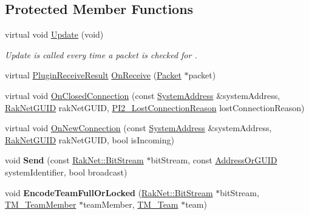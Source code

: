 \subsection*{Protected Member Functions}
\begin{DoxyCompactItemize}
\item 
\hypertarget{class_rak_net_1_1_team_manager_aa347824c887a1032b383143a96855218}{virtual void \hyperlink{class_rak_net_1_1_team_manager_aa347824c887a1032b383143a96855218}{Update} (void)}\label{class_rak_net_1_1_team_manager_aa347824c887a1032b383143a96855218}

\begin{DoxyCompactList}\small\item\em Update is called every time a packet is checked for . \end{DoxyCompactList}\item 
virtual \hyperlink{group___p_l_u_g_i_n___i_n_t_e_r_f_a_c_e___g_r_o_u_p_ga89998adaafb29e5d879113b992161085}{Plugin\-Receive\-Result} \hyperlink{class_rak_net_1_1_team_manager_a6e2cc8a3ca194ab60c74e11f1e6edb80}{On\-Receive} (\hyperlink{struct_rak_net_1_1_packet}{Packet} $\ast$packet)
\item 
virtual void \hyperlink{class_rak_net_1_1_team_manager_a0d27bb1f13806b2413ec067f872b4410}{On\-Closed\-Connection} (const \hyperlink{struct_rak_net_1_1_system_address}{System\-Address} \&system\-Address, \hyperlink{struct_rak_net_1_1_rak_net_g_u_i_d}{Rak\-Net\-G\-U\-I\-D} rak\-Net\-G\-U\-I\-D, \hyperlink{group___p_l_u_g_i_n___i_n_t_e_r_f_a_c_e___g_r_o_u_p_ga376cc546fd6892c2ead48cd51796c8b8}{P\-I2\-\_\-\-Lost\-Connection\-Reason} lost\-Connection\-Reason)
\item 
virtual void \hyperlink{class_rak_net_1_1_team_manager_a87d0516651f2ee7e24867e528d854e0f}{On\-New\-Connection} (const \hyperlink{struct_rak_net_1_1_system_address}{System\-Address} \&system\-Address, \hyperlink{struct_rak_net_1_1_rak_net_g_u_i_d}{Rak\-Net\-G\-U\-I\-D} rak\-Net\-G\-U\-I\-D, bool is\-Incoming)
\item 
\hypertarget{class_rak_net_1_1_team_manager_aabbd4e3f9f56cca8b377a0a3fea55df5}{void {\bfseries Send} (const \hyperlink{class_rak_net_1_1_bit_stream}{Rak\-Net\-::\-Bit\-Stream} $\ast$bit\-Stream, const \hyperlink{struct_rak_net_1_1_address_or_g_u_i_d}{Address\-Or\-G\-U\-I\-D} system\-Identifier, bool broadcast)}\label{class_rak_net_1_1_team_manager_aabbd4e3f9f56cca8b377a0a3fea55df5}

\item 
\hypertarget{class_rak_net_1_1_team_manager_a4f8fd4cc41274eaf68a25e3e8ee59d35}{void {\bfseries Encode\-Team\-Full\-Or\-Locked} (\hyperlink{class_rak_net_1_1_bit_stream}{Rak\-Net\-::\-Bit\-Stream} $\ast$bit\-Stream, \hyperlink{class_rak_net_1_1_t_m___team_member}{T\-M\-\_\-\-Team\-Member} $\ast$team\-Member, \hyperlink{class_rak_net_1_1_t_m___team}{T\-M\-\_\-\-Team} $\ast$team)}\label{class_rak_net_1_1_team_manager_a4f8fd4cc41274eaf68a25e3e8ee59d35}


\end{DoxyCompactItemize}
